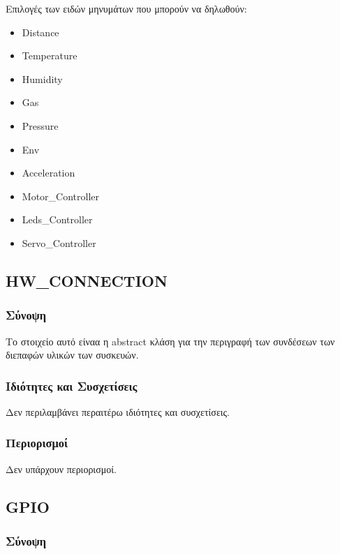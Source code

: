 \noindent Επιλογές των ειδών μηνυμάτων που μπορούν να δηλωθούν:

\begin{itemize}
	\item Distance
	\item Temperature
	\item Humidity
	\item Gas
	\item Pressure
	\item Env
	\item Acceleration
	\item Motor\_Controller
	\item Leds\_Controller
	\item Servo\_Controller
\end{itemize}

\subsection{HW\_CONNECTION}
\label{subsec:hw_connection}

\subsubsection*{Σύνοψη}

\noindent Το στοιχείο αυτό είναα η abstract κλάση για την περιγραφή των συνδέσεων των διεπαφών υλικών των συσκευών.

\subsubsection*{Ιδιότητες και Συσχετίσεις}

\noindent Δεν περιλαμβάνει περαιτέρω ιδιότητες και συσχετίσεις.

\subsubsection*{Περιορισμοί}

\noindent Δεν υπάρχουν περιορισμοί.

\subsection{GPIO}
\label{subsec:gpio_con}

\subsubsection*{Σύνοψη}

